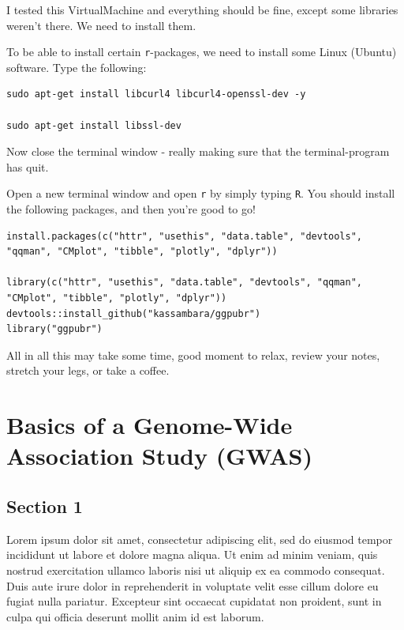 \documentclass[
]{book}
\begin{document}
I tested this VirtualMachine and everything should be fine, except some libraries weren't there. We need to install them.

To be able to install certain \texttt{r}-packages, we need to install some Linux (Ubuntu) software. Type the following:

\begin{verbatim}
sudo apt-get install libcurl4 libcurl4-openssl-dev -y

sudo apt-get install libssl-dev
\end{verbatim}

Now close the terminal window - really making sure that the terminal-program has quit.

Open a new terminal window and open \texttt{r} by simply typing \texttt{R}. You should install the following packages, and then you're good to go!

\begin{verbatim}
install.packages(c("httr", "usethis", "data.table", "devtools", "qqman", "CMplot", "tibble", "plotly", "dplyr"))

library(c("httr", "usethis", "data.table", "devtools", "qqman", "CMplot", "tibble", "plotly", "dplyr"))
devtools::install_github("kassambara/ggpubr")
library("ggpubr")
\end{verbatim}

All in all this may take some time, good moment to relax, review your notes, stretch your legs, or take a coffee.

\hypertarget{basics-of-a-genome-wide-association-study-gwas}{%
\chapter{Basics of a Genome-Wide Association Study (GWAS)}\label{basics-of-a-genome-wide-association-study-gwas}}

\hypertarget{section-1}{%
\section{Section 1}\label{section-1}}

Lorem ipsum dolor sit amet, consectetur adipiscing elit, sed do eiusmod tempor incididunt ut labore et dolore magna aliqua. Ut enim ad minim veniam, quis nostrud exercitation ullamco laboris nisi ut aliquip ex ea commodo consequat. Duis aute irure dolor in reprehenderit in voluptate velit esse cillum dolore eu fugiat nulla pariatur. Excepteur sint occaecat cupidatat non proident, sunt in culpa qui officia deserunt mollit anim id est laborum.
\end{document}
